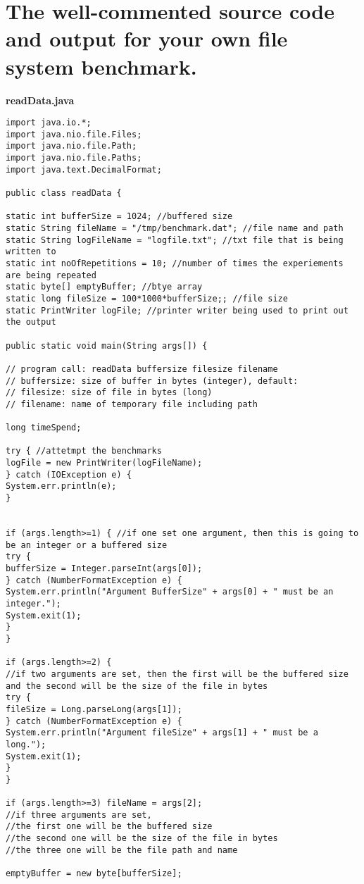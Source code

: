 \documentclass{article}
\begin{document}
\section{The well-commented source code and output for your own file system benchmark.}
\textbf{readData.java}
\begin{lstlisting}
import java.io.*;
import java.nio.file.Files;
import java.nio.file.Path;
import java.nio.file.Paths;
import java.text.DecimalFormat;

public class readData {

static int bufferSize = 1024; //buffered size
static String fileName = "/tmp/benchmark.dat"; //file name and path
static String logFileName = "logfile.txt"; //txt file that is being written to
static int noOfRepetitions = 10; //number of times the experiements are being repeated
static byte[] emptyBuffer; //btye array
static long fileSize = 100*1000*bufferSize;; //file size
static PrintWriter logFile; //printer writer being used to print out the output

public static void main(String args[]) {

// program call: readData buffersize filesize filename
// buffersize: size of buffer in bytes (integer), default:
// filesize: size of file in bytes (long)
// filename: name of temporary file including path

long timeSpend;

try { //attetmpt the benchmarks
logFile = new PrintWriter(logFileName);
} catch (IOException e) {
System.err.println(e);
}


if (args.length>=1) { //if one set one argument, then this is going to be an integer or a buffered size
try {
bufferSize = Integer.parseInt(args[0]);
} catch (NumberFormatException e) {
System.err.println("Argument BufferSize" + args[0] + " must be an integer.");
System.exit(1);
}
}

if (args.length>=2) {
//if two arguments are set, then the first will be the buffered size and the second will be the size of the file in bytes
try {
fileSize = Long.parseLong(args[1]);
} catch (NumberFormatException e) {
System.err.println("Argument fileSize" + args[1] + " must be a long.");
System.exit(1);
}
}

if (args.length>=3) fileName = args[2];
//if three arguments are set,
//the first one will be the buffered size
//the second one will be the size of the file in bytes
//the three one will be the file path and name

emptyBuffer = new byte[bufferSize];


\end{lstlisting}
\end{document}

